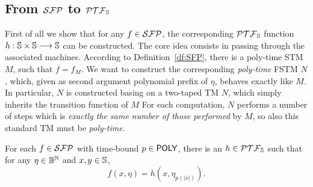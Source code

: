 \subsection{From $\mathcal{SFP}$ to $\mathcal{PTF}_{\mathbb{S}}$}\label{sec:H}
First of all we show that for any $f\in \mathcal{SFP}$,
the corresponding $\mathcal{PTF}_{\mathbb{S}}$ function
$h:\mathbb{S} \times \mathbb{S}\longrightarrow \mathbb{S}$ can be constructed.
%
The core idea consists in passing through
the associated machines.
%
According to Definition~\ref{df:SFP},
there is a poly-time STM $M$, such that $f=f_M$.
%
We want to construct the corresponding
\emph{poly-time} FSTM $N$, which,
given as second argument polynomial prefix of $\eta$,
behaves exactly like $M$.
%
In particular, $N$ is constructed basing on a
two-taped TM $N$, which
simply inherits the transition function of $M$
%
For each computation,
$N$ performs a number of steps which
is \emph{exactly the same number of those performed} by $M$,
so also this standard TM must be \emph{poly-time}.



\begin{lemma}\label{lemma:SFPtopolyF}
For each $f\in \mathcal{SFP}$ with time-bound $p\in \mathsf{POLY}$,
there is an $h \in \mathcal{PTF}_{\mathbb{S}}$ such that
for any $\eta\in \mathbb{B}^{\mathbb{N}}$ and $x, y\in \mathbb{S}$,
$$
f(x,\eta) = h(x, \eta_{p(|x|)}).
$$
\end{lemma}



